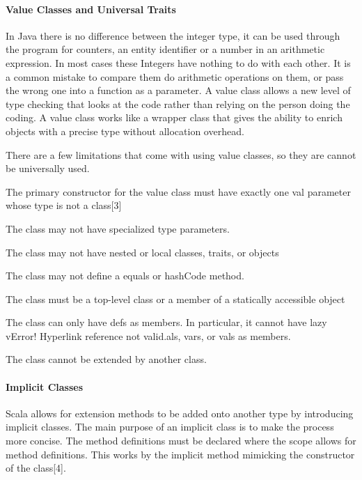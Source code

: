 \documentclass[12pt]{article}
\begin{document}
		\paragraph{Value Classes and Universal Traits} In Java there is no difference between the integer type, it can be used through the program for counters, an entity identifier or a number in an arithmetic expression. In most cases these Integers have nothing to do with each other. It is a common mistake to compare them do arithmetic operations on them, or pass the wrong one into a function as a parameter. A value class allows a new level of type checking that looks at the code rather than relying on the person doing the coding. A value class works like a wrapper class that gives the ability to enrich objects with a precise type without allocation overhead. 

There are a few limitations that come with using value classes, so they are cannot be universally used. 

		\begin{description}
			\item The primary constructor for the value class must have exactly one val parameter whose type is not a class[3]
			\item The class may not have specialized type parameters.
			\item The class may not have nested or local classes, traits, or objects
			\item The class may not define a equals or hashCode method.
			\item The class must be a top-level class or a member of a statically accessible object
			\item The class can only have defs as members. In particular, it cannot have lazy vError! Hyperlink reference not valid.als, vars, or vals as members.
			\item The class cannot be extended by another class.
		\end{description}

		\paragraph{Implicit Classes}Scala allows for extension methods to be added onto another type by introducing implicit classes. The main purpose of an implicit class is to make the process more concise. The method definitions must be declared where the scope allows for method definitions. This works by the implicit method mimicking the constructor of the class[4]. 
\end{document}
